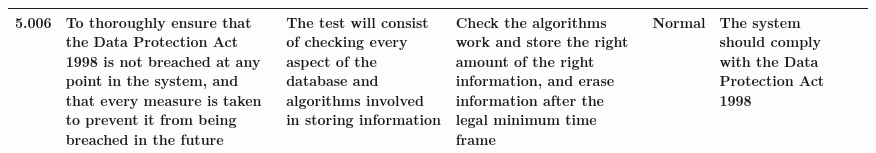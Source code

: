 \begin{landscape}
\begin{center}
\begin{longtable}{|p{1.5cm}|p{2.5cm}|p{2.5cm}|p{2cm}|p{2cm}|p{2cm}|p{2cm}|p{2cm}|}
5.006 & To thoroughly ensure that the Data Protection Act 1998 is not breached at any point in the system, and that every measure is taken to prevent it from being breached in the future & The test will consist of checking every aspect of the database and algorithms involved in storing information & Check the algorithms work and store the right amount of the right information, and erase information after the legal minimum time frame & Normal & The system should comply with the Data Protection Act 1998 & & \\ \hline
    \end{longtable}
\end{center}
\end{landscape}